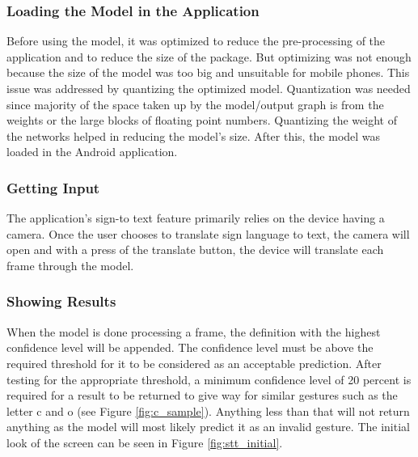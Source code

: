 \documentclass[journal]{./IEEE/IEEEtran}
\begin{document}
\subsubsection{Loading the Model in the Application}
Before using the model, it was optimized to reduce the pre-processing of the application and to reduce the size of the package. But optimizing was not enough because the size of the model was too big and unsuitable for mobile phones. This issue was addressed by quantizing the optimized model.
\newline
\indent Quantization was needed since majority of the space taken up by the model/output graph is from the weights or the large blocks of floating point numbers. Quantizing the weight of the networks helped in reducing the model's size. After this, the model was loaded in the Android application.
\newline
\subsubsection{Getting Input}
The application's sign-to text feature primarily relies on the device having a camera. Once the user chooses to translate sign language to text, the camera will open and with a press of the translate button, the device will translate each frame through the model.
\newline
\subsubsection{Showing Results}
When the model is done processing a frame, the definition with the highest confidence level will be appended. The confidence level must be above the required threshold for it to be considered as an acceptable prediction.
\newline
\indent After testing for the appropriate threshold, a minimum confidence level of 20 percent is required for a result to be returned to give way for similar gestures such as the letter c and o (see Figure \ref{fig:c_sample}). Anything less than that will not return anything as the model will most likely predict it as an invalid gesture. The initial look of the screen can be seen in Figure \ref{fig:stt_initial}.
\end{document}
